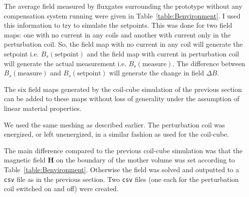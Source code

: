 The average field measured by fluxgates surrounding the prototype
without any compensation system running were given in
Table~\ref{table:Benvironment}.  I used this information to try to
simulate the setpoints.  This was done for two field maps: one with no
current in any coils and another with current only in the perturbation
coil.  So, the field map with no current in any coil will generate the
setpoint i.e. $B_s(\text{setpoint})$ and the field map with current in
perturbation coil will generate the actual measurement
i.e. $B_s(\text{measure})$. The difference between
$B_s(\text{measure})$ and $B_s(\text{setpoint})$ will generate the
change in field $\Delta B$.

The six field maps generated by the coil-cube simulation of the
previous section can be added to these maps without loss of generality
under the assumption of linear material properties.

We used the same meshing as described earlier.  The perturbation coil
was energized, or left unenergized, in a similar fashion as used for
the coil-cube.  

The main difference compared to the previous coil-cube simulation was
that the magnetic field $\bm{H}$ on the boundary of the mother volume
was set according to Table~\ref{table:Benvironment}.  Otherwise the
field was solved and outputted to a {\tt csv} file as in the previous
section.  Two {\tt csv} files (one each for the perturbation coil
switched on and off) were created.




